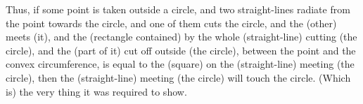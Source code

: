 \begin{Parallel}{}{}
{Thus, if some point is taken outside a circle, and two straight-lines radiate
from the point towards the circle, and one of them cuts the circle, and the
(other) meets (it), and the (rectangle contained) by the whole (straight-line)
cutting (the circle), and the (part of it) 
cut off outside (the circle),
between the point and the convex circumference,  is equal to the (square)
on the (straight-line) meeting (the circle), then the (straight-line)
meeting (the circle) will touch the circle. (Which is) the very thing it was
required to show.}
\end{Parallel}
